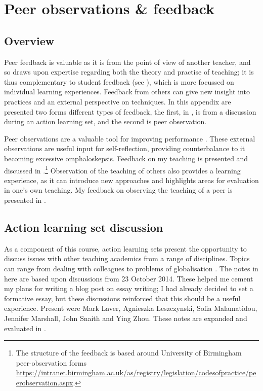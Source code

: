 \chapter{Peer observations \& feedback}\label{ap:peer}

\section{Overview}

Peer feedback is valuable as it is from the point of view of another teacher, and so draws upon expertise regarding both the theory and practise of teaching; it is thus complementary to student feedback (see ), which is more focussed on individual learning experiences. Feedback from others can give new insight into practices and an external perspective on techniques. In this appendix are presented two forms different types of feedback, the first, in , is from a discussion during an action learning set, and the second is peer observation.

Peer observations are a valuable tool for improving performance \citep{Ketteridge2015}. These external observations are useful input for self-reflection, providing counterbalance to it becoming excessive omphaloskepsis. Feedback on my teaching is presented and discussed in .\footnote{The structure of the feedback is based around University of Birmingham peer-observation forms \url{https://intranet.birmingham.ac.uk/as/registry/legislation/codesofpractice/peerobservation.aspx}.} Observation of the teaching of others also provides a learning experience, as it can introduce new approaches and highlights areas for evaluation in one's own teaching. My feedback on observing the teaching of a peer is presented in .

\section{Action learning set discussion}\label{sec:ALS}

As a component of this course, action learning sets present the opportunity to discuss issues with other teaching academics from a range of disciplines. Topics can range from dealing with colleagues to problems of globalisation \citep[cf.]{Marshall2015}. The notes in  here are based upon discussions from 23 October 2014. These helped me cement my plans for writing a blog post on essay writing; I had already decided to set a formative essay, but these discussions reinforced that this should be a useful experience. Present were Mark Laver, Agnieszka Leszczynski, Sofia Malamatidou, Jennifer Marshall, John Snaith and Ying Zhou. These notes are expanded and evaluated in .

